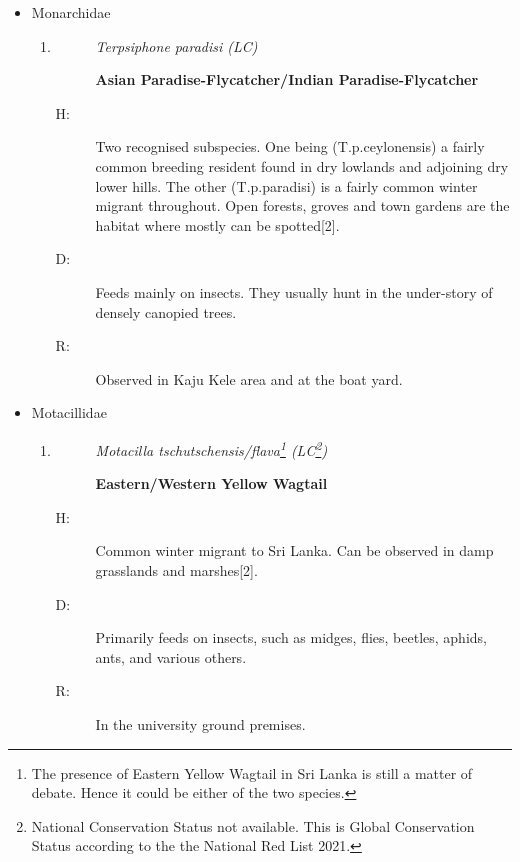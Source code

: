 \begin{itemize}
\begin{enumerate}
\begin{description}
\end{description}%
\end{enumerate}%
\item%
Monarchidae%
\begin{enumerate}%
\item%
\begin{description}%
\item[]%
\textit{Terpsiphone paradisi (LC)}%
\item[]%
\textbf{Asian Paradise{-}Flycatcher/Indian Paradise{-}Flycatcher}%
\end{description}%
\begin{description}%
\item[H: ]%
Two recognised subspecies. One being (T.p.ceylonensis) a fairly common breeding resident found in dry lowlands and adjoining dry lower hills. The other (T.p.paradisi) is a fairly common winter migrant throughout. Open forests, groves and town gardens are the habitat where mostly can be spotted{[}2{]}.%
\item[D: ]%
Feeds mainly on insects.  They usually hunt in the under-story of densely canopied trees.%
\item[R: ]%
Observed in Kaju Kele area and at the boat yard.%
\end{description}%
\end{enumerate}%
\item%
Motacillidae%
\begin{enumerate}%
\item%
\begin{description}%
\item[]%
\textit{Motacilla tschutschensis/flava\footnote{The presence of Eastern Yellow Wagtail in Sri Lanka is still a matter of debate. Hence it could be either of the two species. } (LC\footnote{National Conservation Status not available. This is Global Conservation Status according to the the National Red List 2021.})}%
\item[]%
\textbf{Eastern/Western Yellow Wagtail}%
\end{description}%
\begin{description}%
\item[H: ]%
Common winter migrant to Sri Lanka. Can be observed in damp grasslands and marshes{[}2{]}.%
\item[D: ]%
Primarily feeds on insects, such as midges, flies, beetles, aphids, ants, and various others.%
\item[R: ]%
In the university ground premises.%
\end{description}%

\end{enumerate}
\end{itemize}
